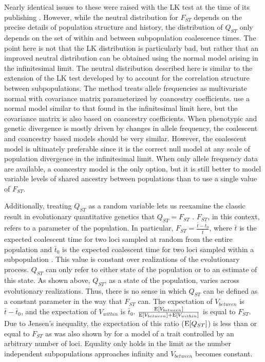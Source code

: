 Nearly identical issues to these were raised with the LK test at the time of its
publishing \citep{Nei1975,Robertson1975}. However, while the neutral
distribution for $F_{ST}$ depends on the precise details of population structure
and history, the distribution of $Q_{ST}$ only depends on the set of within and
between subpopulation coalescence times. The point here is not that the LK
distribution is particularly bad, but rather that an improved neutral
distribution can be obtained using the normal model arising in the infinitesimal
limit. The neutral distribution described here is similar to the extension of
the LK test developed by \citet{Bonhomme2010} to account for the correlation
structure between subpopulations. The \citet{Bonhomme2010} method treats allele
frequencies as multivariate normal with covariance matrix parameterized by
coancestry coefficients. \citet{Ovaskainen2011} use a normal model similar to
that found in the infinitesimal limit here, but the covariance matrix is also
based on coancestry coefficients. When phenotypic and genetic divergence is
mostly driven by changes in allele frequency, the coalescent and coancestry
based models should be very similar. However, the coalescent model is ultimately
preferable since it is the correct null model at any scale of population
divergence in the infinitesimal limit. When only allele frequency data are
available, a coancestry model is the only option, but it is still better to
model variable levels of shared ancestry between populations than to use a
single value of $F_{ST}$.

Additionally, treating $Q_{ST}$ as a random variable lets us reexamine the
classic result in evolutionary quantitative genetics that $Q_{ST}=F_{ST}$
\citep{Whitlock1999}. $F_{ST}$, in this context, refers to a parameter of the
population. In particular, $F_{ST} = \frac{\bar{t} - \bar{t}_0}{\bar{t}}$, where
$\bar{t}$ is the expected coalescent time for two loci sampled at random from
the entire population and $\bar{t}_0$ is the expected coalescent time for two
loci sampled within a subpopulation \citep{Slatkin1991}. This value is constant
over realizations of the evolutionary process. $Q_{ST}$ can only refer to either
state of the population or to an estimate of this state. As shown above,
$Q_{ST}$, as a state of the population, varies across evolutionary realizations.
Thus, there is no sense in which $Q_{ST}$ can be defined as a constant parameter
in the way that $F_{ST}$ can. The expectation of $V_{between}$ is $\bar{t} -
\bar{t}_0$, and the expectation of $V_{within}$ is $\bar{t}_0$.
$\frac{\mathrm{E}[V_{between}]}{\mathrm{E}[V_{between}] + \mathrm{E}[V_{within}]}$ is equal to $F_{ST}$.
Due to Jensen's inequality, the expectation of this ratio ($\mathrm{E}[Q_{ST}]$) is less
than or equal to $F_{ST}$ as was also shown by \citet{Edge2015} for a model of a
trait controlled by an arbitrary number of loci. Equality only holds in the
limit as the number independent subpopulations approaches infinity and
$V_{between}$ becomes constant.

